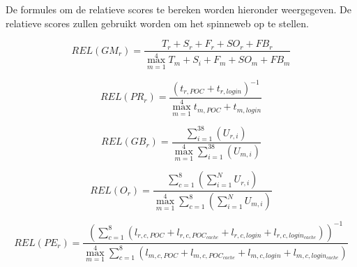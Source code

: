 De formules om de relatieve scores te bereken worden hieronder weergegeven.
De relatieve scores zullen gebruikt worden om het spinneweb op te stellen.

\begin{equation}
  REL(GM_r)=\frac{T_r+S_r+F_r+SO_r+FB_r}{\max_{m=1}^{4}{T_m+S_i+F_m+SO_m+FB_m}}
  \label{eq:rel-populariteit}
\end{equation}

\begin{equation}
  REL(PR_r) = \frac{\left({t_{r,POC} + t_{r,login}}\right)^{-1}}{\max_{m=1}^{4}{t_{m,POC} + t_{m,login}}}
  \label{eq:rel-productiviteit}
\end{equation}

\begin{equation}
  REL(GB_r) = \frac{\sum_{i=1}^{38}{\left(U_{r,i}\right)}}{\max_{m=1}^{4}{\sum_{i=1}^{38}{\left(U_{m,i}\right)}}}
  \label{eq:rel-gebruik}
\end{equation}

\begin{equation}
  REL(O_r) = \frac{\sum_{c=1}^{8}{\left(\sum_{i=1}^{N}U_{r,i}\right)}}{\max_{m=1}^{4}{\sum_{c=1}^{8}{\left(\sum_{i=1}^{N}U_{m,i}\right)}}}
  \label{eq:rel-ondersteuning}
\end{equation}

\begin{equation}
  REL(PE_r)= \frac{\left(\sum_{c=1}^{8}{\left(l_{r,c,POC}+l_{r,c,POC_{cache}}+l_{r,c,login}+l_{r,c,login_{cache}}\right)}\right)^{-1}}{\max_{m=1}^{4}{\sum_{c=1}^{8}{\left(l_{m,c,POC}+l_{m,c,POC_{cache}}+l_{m,c,login}+l_{m,c,login_{cache}}\right)}}}
  \label{eq:rel-performantie}
\end{equation}
